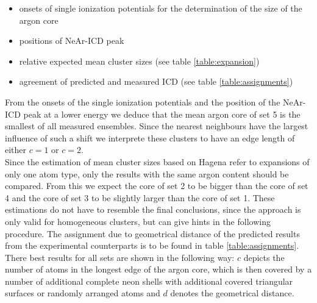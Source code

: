 \begin{itemize}
 \item onsets of single ionization potentials for the determination
       of the size of the argon core
 \item positions of NeAr-ICD peak
 \item relative expected mean cluster sizes (see table \ref{table:expansion})
 \item agreement of predicted and measured ICD (see table \ref{table:assignments})
\end{itemize}

From the onsets of the single ionization potentials and the position of the
NeAr-ICD peak at a lower energy we deduce that the mean argon core of set 5
is the smallest of all measured ensembles. Since the nearest neighbours have
the largest influence of such a shift we interprete these clusters to have
an edge length of either $c=1$ or $c=2$.\\
Since the estimation of mean cluster sizes based on Hagena refer to expansions
of only one atom type, only the results with the same argon content should
be compared. From this we expect the core of set 2 to be bigger than the core
of set 4 and the core of set 3 to be slightly larger than the core of set 1.
These estimations do not have to resemble the final conclusions, since the
approach is only valid for homogeneous clusters, but can give hints
in the following procedure. The assignment due to geometrical distance
of the predicted results from the experimental counterparts is to be found in
table \ref{table:assignments}. There best results for all sets are shown
in the following way: $c$ depicts the number of atoms in the longest edge
of the argon core, which is then covered by a number of additional complete
neon shells with additional covered triangular surfaces or randomly arranged atoms
and $d$ denotes the geometrical distance.\\

